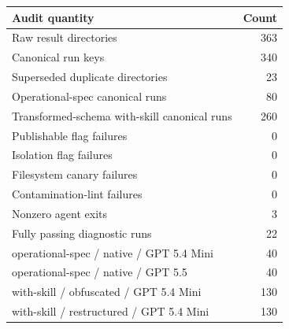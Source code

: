 \begin{tabular}{lr}
\toprule
Audit quantity & Count \\
\midrule
Raw result directories & 363 \\
Canonical run keys & 340 \\
Superseded duplicate directories & 23 \\
Operational-spec canonical runs & 80 \\
Transformed-schema with-skill canonical runs & 260 \\
Publishable flag failures & 0 \\
Isolation flag failures & 0 \\
Filesystem canary failures & 0 \\
Contamination-lint failures & 0 \\
Nonzero agent exits & 3 \\
Fully passing diagnostic runs & 22 \\
operational-spec / native / GPT 5.4 Mini & 40 \\
operational-spec / native / GPT 5.5 & 40 \\
with-skill / obfuscated / GPT 5.4 Mini & 130 \\
with-skill / restructured / GPT 5.4 Mini & 130 \\
\bottomrule
\end{tabular}
